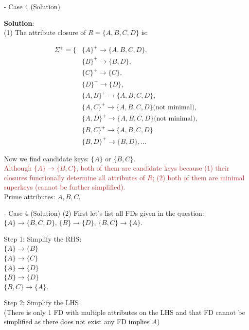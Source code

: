 \begin{frame}[fragile]{ - Case 4 (Solution)}
	
	\textbf{Solution}:\\
	(1) The attribute closure of $R = \{A, B, C, D\}$ is:\\
	\begin{scriptsize}
		\begin{align*} 
			\Sigma^{+} = \{&\{A\}^{+} \rightarrow \{A, B, C, D\},\\
			&\{B\}^{+} \rightarrow \{B, D\},\\
			&\{C\}^{+} \rightarrow \{C\},\\
			&\{D\}^{+} \rightarrow \{D\},\\
			&\{A, B\}^{+} \rightarrow \{A, B, C, D\},\\
			&\{A, C\}^{+} \rightarrow \{A, B, C, D\} \text{(not minimal)},\\
			&\{A, D\}^{+} \rightarrow \{A, B, C, D\} \text{(not minimal)},\\
			&\{B, C\}^{+} \rightarrow \{A, B, C, D\}\\
			&\{B, D\}^{+} \rightarrow \{B, D\}, ...
		\end{align*}
	\end{scriptsize}\vspace{-15pt}
	
	Now we find candidate keys: $\{A\}$ or $\{B, C\}$.\\
	\textcolor{brown}{Although $\{A\}\rightarrow\{B, C\}$, both of them are candidate keys because (1) their closures functionally determine all attributes of $R$; (2) both of them are minimal superkeys (cannot be further simplified).}\\
	Prime attributes: $A, B, C$.
\end{frame}

\begin{frame}[fragile]{ - Case 4 (Solution)}
	(2) First let's list all FDs given in the question:\\\vspace{5pt}
	$\{A\} \rightarrow \{B,C,D\}$, 
	$\{B\} \rightarrow \{D\}$, 
	$\{B, C\} \rightarrow \{A\}$.\\\vspace{5pt}
	
	Step 1: Simplify the RHS:\\\vspace{5pt}
	$\{A\} \rightarrow \{B\}$\\
	$\{A\} \rightarrow \{C\}$\\
	$\{A\} \rightarrow \{D\}$\\
	$\{B\} \rightarrow \{D\}$\\
	$\{B, C\} \rightarrow \{A\}$.\\\vspace{5pt}
	
	Step 2: Simplify the LHS \\
	(There is only 1 FD with multiple attributes on the LHS and that FD cannot be simplified as there does not exist any FD implies $A$) \\\vspace{5pt}
	
\end{frame}

